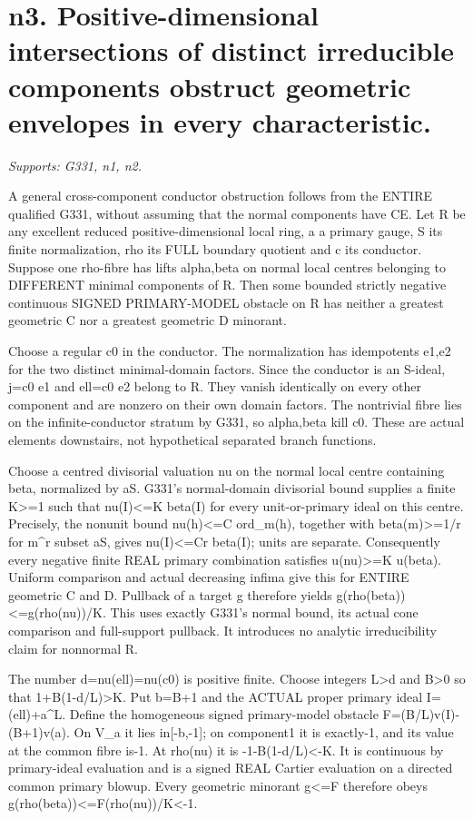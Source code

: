 \section{n3. Positive-dimensional intersections of distinct irreducible components obstruct geometric envelopes in every characteristic.}
\textit{Supports: G331, n1, n2.}

A general cross-component conductor obstruction follows from the ENTIRE qualified G331, without assuming that the normal components have CE. Let R be any excellent reduced positive-dimensional local ring, a a primary gauge, S its finite normalization, rho its FULL boundary quotient and c its conductor. Suppose one rho-fibre has lifts alpha,beta on normal local centres belonging to DIFFERENT minimal components of R. Then some bounded strictly negative continuous SIGNED PRIMARY-MODEL obstacle on R has neither a greatest geometric C nor a greatest geometric D minorant.

Choose a regular c0 in the conductor. The normalization has idempotents e1,e2 for the two distinct minimal-domain factors. Since the conductor is an S-ideal, j=c0 e1 and ell=c0 e2 belong to R. They vanish identically on every other component and are nonzero on their own domain factors. The nontrivial fibre lies on the infinite-conductor stratum by G331, so alpha,beta kill c0. These are actual elements downstairs, not hypothetical separated branch functions.

Choose a centred divisorial valuation nu on the normal local centre containing beta, normalized by aS. G331's normal-domain divisorial bound supplies a finite K\textgreater{}=1 such that nu(I)\textless{}=K beta(I) for every unit-or-primary ideal on this centre. Precisely, the nonunit bound nu(h)\textless{}=C ord\_m(h), together with beta(m)\textgreater{}=1/r for m\textasciicircum{}r subset aS, gives nu(I)\textless{}=Cr beta(I); units are separate. Consequently every negative finite REAL primary combination satisfies u(nu)\textgreater{}=K u(beta). Uniform comparison and actual decreasing infima give this for ENTIRE geometric C and D. Pullback of a target g therefore yields g(rho(beta))\textless{}=g(rho(nu))/K. This uses exactly G331's normal bound, its actual cone comparison and full-support pullback. It introduces no analytic irreducibility claim for nonnormal R.

The number d=nu(ell)=nu(c0) is positive finite. Choose integers L\textgreater{}d and B\textgreater{}0 so that 1+B(1-d/L)\textgreater{}K. Put b=B+1 and the ACTUAL proper primary ideal I=(ell)+a\textasciicircum{}L. Define the homogeneous signed primary-model obstacle
F=(B/L)v(I)-(B+1)v(a).
On V\_a it lies in[-b,-1]; on component1 it is exactly-1, and its value at the common fibre is-1. At rho(nu) it is -1-B(1-d/L)\textless{}-K. It is continuous by primary-ideal evaluation and is a signed REAL Cartier evaluation on a directed common primary blowup. Every geometric minorant g\textless{}=F therefore obeys g(rho(beta))\textless{}=F(rho(nu))/K\textless{}-1.

